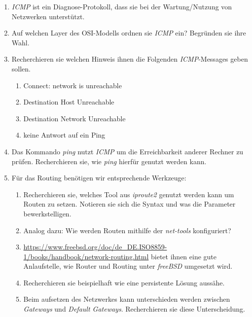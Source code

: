 \documentclass[paper=a4,fontsize=11pt]{scrartcl}%
\numberwithin{equation}{section}
\begin{document}
\begin{enumerate}
	\item \emph{ICMP} ist ein Diagnose-Protokoll, dass sie bei der Wartung/Nutzung von Netzwerken unterstützt.
	\item Auf welchen Layer des OSI-Modells ordnen sie \emph{ICMP} ein? Begründen sie ihre Wahl.
	\item Recherchieren sie welchen Hinweis ihnen die Folgenden \emph{ICMP}-Messages geben sollen.
	\begin{enumerate}
		\item Connect: network is unreachable
		\item Destination Host Unreachable
		\item Destination Network Unreachable
		\item keine Antwort auf ein Ping
	\end{enumerate}
	\item Das Kommando \emph{ping} nutzt \emph{ICMP} um die Erreichbarkeit anderer Rechner zu prüfen. Recherchieren sie, wie \emph{ping} hierfür genutzt werden kann.
	\item Für das Routing benötigen wir entsprechende Werkzeuge:
	\begin{enumerate}
		\item Recherchieren sie, welches Tool aus \emph{iproute2} genutzt werden kann um Routen zu setzen. Notieren sie sich die Syntax und was die Parameter bewerkstelligen.
	\item Analog dazu: Wie werden Routen mithilfe der \emph{net-tools} konfiguriert?
	\item \url{https://www.freebsd.org/doc/de_DE.ISO8859-1/books/handbook/network-routing.html} bietet ihnen eine gute Anlaufstelle, wie Router und Routing unter \emph{freeBSD} umgesetzt wird.
	\item Recherchieren sie beispielhaft wie eine persistente Lösung aussähe.
	\item Beim aufsetzen des Netzwerkes kann unterschieden werden zwischen \emph{Gateways} und \emph{Default Gateways}. Recherchieren sie diese Unterscheidung.
\end{enumerate}	 
\end{enumerate}

\printbibliography
\end{document}
